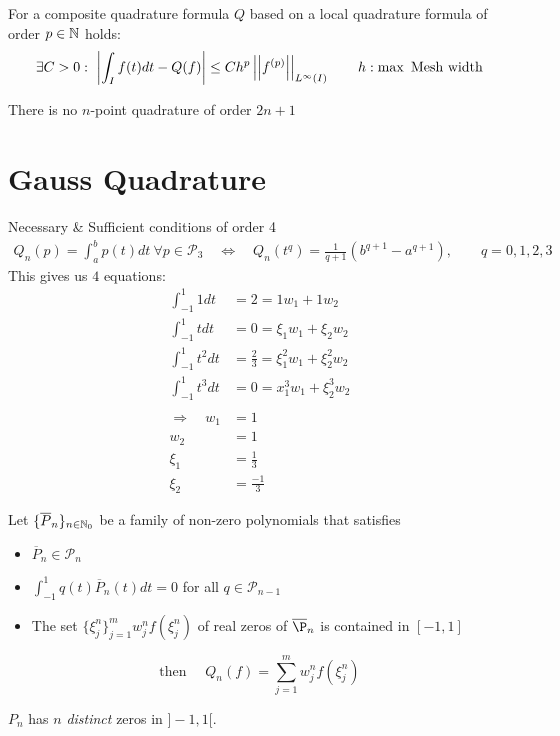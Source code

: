 	\begin{theorem}
	 For a composite quadrature formula $Q$ based on a local quadrature formula of order $p\in \mathbb{N}$ holds:
	 \[
	  \exists C >0:\ \left| \int_I f(t) dt - Q(f)\right| \leq Ch^p \left|\left| f^{(p)} \right|\right|_{L^\infty(I)} \qquad h: \max \text{ Mesh width}
	 \]
	\end{theorem}
	
	\begin{lemma}
	 There is no $n$-point quadrature of order $2n+1$
	\end{lemma}

\section{Gauss Quadrature}
	Necessary \& Sufficient conditions of order 4
	\begin{align*}
	 Q_n(p) = \int_a^b p(t) dt\ \forall p \in \mathcal P_3 \quad \Leftrightarrow \quad Q_n(t^q) = \frac{1}{q+1}(b^{q+1} - a^{q+1}),\qquad q=0,1,2,3
	\end{align*}
	This gives us $4$ equations:
	\begin{align*}
			\int_{-1}^1 1 dt &= 2 = 1w_1 + 1w_2\\
			\int_{-1}^1 t dt &= 0 = \xi_1w_1+\xi_2w_2\\
			\int_{-1}^1 t^2 dt &= \frac{2}{3} = \xi_1^2w_1 + \xi_2^2 w_2\\
			\int_{-1}^1 t^3 dt &= 0 = x_1^3w_1 + \xi_2^3 w_2\\
		\\	
		\Longrightarrow \quad	w_1 &= 1\\
				w_2 &= 1\\
				\xi_1 &= \frac{1}{3}\\
				\xi_2 &= \frac{-1}{3}
	\end{align*}
	
	\begin{theorem}
		Let $\{\overline P_n\}_{n \in \mathbb{N}_0}$ be a family of non-zero polynomials that satisfies
		\begin{itemize}
		 \item $\overline P_n \in \mathcal P_n$
		 \item $\int_{-1}^1 q(t) \overline P_n (t) dt = 0 $ for all $q\in \mathcal P_{n-1}$
		 \item The set $\{ \xi_j^n\}_{j=1}^m w_j^n f(\xi_j^n)$ of real zeros of $\overline \P_n$ is contained in $[-1,1]$
		\end{itemize}
		\[
		 \text{then }\quad Q_n(f) = \sum_{j=1}^m w_j^n f(\xi_j^n)
		\]
	\end{theorem}
	
	\begin{lemma}
	 $P_n$ has $n$ \emph{distinct} zeros in $]-1,1[$.
	\end{lemma}






